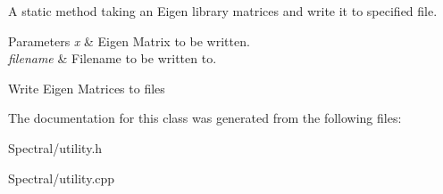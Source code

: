 A static method taking an Eigen library matrices and write it to specified file. 


\begin{DoxyParams}{Parameters}
{\em x} & Eigen Matrix to be written. \\
\hline
{\em filename} & Filename to be written to.\\
\hline
\end{DoxyParams}
Write Eigen Matrices to files 

The documentation for this class was generated from the following files\+:\begin{DoxyCompactItemize}
\item 
Spectral/utility.\+h\item 
Spectral/utility.\+cpp\end{DoxyCompactItemize}

